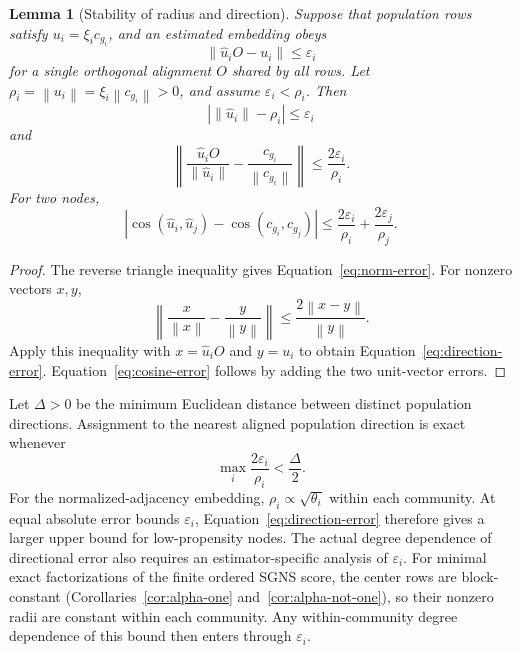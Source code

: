 \documentclass[aps,pre,reprint,superscriptaddress,longbibliography]{revtex4-2}
\newcommand{\norm}[1]{\left\lVert #1 \right\rVert}
\newcommand{\abs}[1]{\left\lvert #1 \right\rvert}
\newtheorem{lemma}[theorem]{Lemma}
\begin{document}
\begin{lemma}[Stability of radius and direction]
\label{lem:stability}
Suppose that population rows satisfy \(u_i=\xi_i c_{g_i}\), and an estimated embedding obeys
\begin{equation}
    \norm{\widehat{u}_iO-u_i}\leq\varepsilon_i
    \label{eq:row-error}
\end{equation}
for a single orthogonal alignment \(O\) shared by all rows.
Let
\(\rho_i=\norm{u_i}=\xi_i\norm{c_{g_i}}>0\), and assume \(\varepsilon_i<\rho_i\).
Then
\begin{equation}
    \abs{\norm{\widehat{u}_i}-\rho_i}
    \leq
    \varepsilon_i
    \label{eq:norm-error}
\end{equation}
and
\begin{equation}
    \norm{
        \frac{\widehat{u}_iO}{\norm{\widehat{u}_i}}
        -
        \frac{c_{g_i}}{\norm{c_{g_i}}}
    }
    \leq
    \frac{2\varepsilon_i}{\rho_i}.
    \label{eq:direction-error}
\end{equation}
For two nodes,
\begin{equation}
    \abs{
        \cos(\widehat{u}_i,\widehat{u}_j)
        -
        \cos(c_{g_i},c_{g_j})
    }
    \leq
    \frac{2\varepsilon_i}{\rho_i}
    +
    \frac{2\varepsilon_j}{\rho_j}.
    \label{eq:cosine-error}
\end{equation}
\end{lemma}

\begin{proof}
The reverse triangle inequality gives Equation~\eqref{eq:norm-error}.
For nonzero vectors \(x,y\),
\begin{equation}
    \norm{
        \frac{x}{\norm{x}}
        -
        \frac{y}{\norm{y}}
    }
    \leq
    \frac{2\norm{x-y}}{\norm{y}}.
\end{equation}
Apply this inequality with \(x=\widehat{u}_iO\) and \(y=u_i\) to obtain Equation~\eqref{eq:direction-error}.
Equation~\eqref{eq:cosine-error} follows by adding the two unit-vector errors.
\end{proof}

Let \(\Delta>0\) be the minimum Euclidean distance between distinct population directions.
Assignment to the nearest aligned population direction is exact whenever
\begin{equation}
    \max_i\frac{2\varepsilon_i}{\rho_i}<\frac{\Delta}{2}.
    \label{eq:direction-recovery}
\end{equation}
For the normalized-adjacency embedding, \(\rho_i\propto\sqrt{\theta_i}\) within each community.
At equal absolute error bounds \(\varepsilon_i\), Equation~\eqref{eq:direction-error} therefore gives a larger upper bound for low-propensity nodes.
The actual degree dependence of directional error also requires an estimator-specific analysis of \(\varepsilon_i\).
For minimal exact factorizations of the finite ordered SGNS score, the center rows are block-constant (Corollaries~\ref{cor:alpha-one} and~\ref{cor:alpha-not-one}), so their nonzero radii are constant within each community.
Any within-community degree dependence of this bound then enters through \(\varepsilon_i\).
\end{document}
